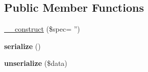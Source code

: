 \subsection*{Public Member Functions}
\begin{DoxyCompactItemize}
\item 
\hyperlink{classTk_1_1Url_ade1df2f08de3b18edd5f81edc241f000}{\+\_\+\+\_\+construct} (\$spec= '')
\item 
\hypertarget{classTk_1_1Url_af53e5533c1bbcdad8cf5dbccabd5efdb}{{\bfseries serialize} ()}\label{classTk_1_1Url_af53e5533c1bbcdad8cf5dbccabd5efdb}

\item 
\hypertarget{classTk_1_1Url_a574a2919cf702475f6eec1b71fa07ec6}{{\bfseries unserialize} (\$data)}\label{classTk_1_1Url_a574a2919cf702475f6eec1b71fa07ec6}


\end{DoxyCompactItemize}
